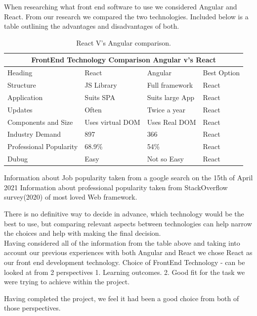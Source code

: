 \vspace{5mm}
When researching what front end software to use we considered Angular and React. From our research we compared the two technologies. Included below is a table outlining the advantages and disadvantages of both.
\begin{table}[ht]
\centering
\begin{tabular}{ |p{3cm}||p{3cm}|p{3cm}|p{3cm}| }
 \hline
 \multicolumn{4}{|c|}{FrontEnd Technology Comparison Angular v's React} \\

 \hline
 Heading& React& Angular&Best Option\\
 \hline
 Structure   & JS Library    &Full framework &  React\\
 Application & Suits SPA    & Suits large App   &React\\
 Updates &Often & Twice a year&  React\\
 Components and Size    &Uses virtual DOM & Uses Real DOM&  React\\
 Industry Demand&   897  & 366& React\\
 Professional Popularity& 68.9\% &54\%   &React\\
 Dubug& Easy& Not so Easy& React\\

 \hline
\end{tabular}
 \caption{React V's Angular comparison.}
  \label{table:myTable}
\end{table}

\hfill \break


Information about Job popularity taken from a google search on the 15th of April 2021
Information about professional popularity taken from StackOverflow survey(2020) of most loved Web framework.\cite{favtech}

\vspace{5mm}
There is no definitive way to decide in advance, which technology would be the best to use, but comparing relevant aspects between technologies can help narrow the choices and help with making the final decision.\\Having considered all of the information from the table above and taking into account our previous experiences with both Angular and React we chose React as our front end development technology.
Choice of FrontEnd Technology - can be looked at from 2 perspectives 1. Learning outcomes.
2. Good fit for the task we were trying to achieve within the project.

Having completed the project, we feel it had been a good choice from both of those perspectives.

